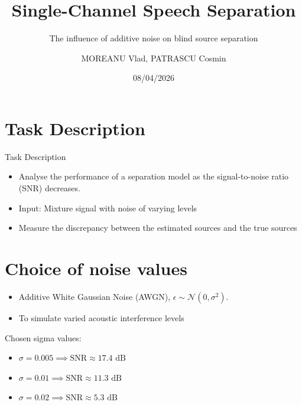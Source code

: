 \documentclass{beamer}
\author{MOREANU Vlad, PATRASCU Cosmin}
\title{Single-Channel Speech Separation}
\subtitle{The influence of additive noise on blind source separation}
\institute{National University of Science and Technology POLITEHNICA Bucharest}
\date{08/04/2026}
\begin{document}
\begin{frame}
    \titlepage
    \begin{figure}[htpb]
        \begin{center}
        \end{center}
    \end{figure}
\end{frame}

\begin{frame}
    \tableofcontents[sectionstyle=show,subsectionstyle=show/shaded/hide,subsubsectionstyle=show/shaded/hide]
\end{frame}


\section{Task Description}

\begin{frame}{Task Description}
    \begin{itemize}[<+-| alert@+>] 
        \item Analyse the performance of a separation model as the signal-to-noise ratio (SNR) decreases.
        \item Input: Mixture signal with noise of varying levels
        \item Measure the discrepancy between the estimated sources and the true sources
    \end{itemize}
\end{frame}


\section{Choice of noise values}
\begin{frame}
    \begin{itemize}
        \item Additive White Gaussian Noise (AWGN), $\epsilon \sim \mathcal{N}(0, \sigma^2)$.
        \item To simulate varied acoustic interference levels
    \end{itemize}
\end{frame}

\begin{frame}
    Chosen sigma values:
    \begin{itemize}
            \item $\sigma = 0.005 \implies \text{SNR} \approx 17.4 \text{ dB}$
            \item $\sigma = 0.01 \implies \text{SNR} \approx 11.3 \text{ dB}$
            \item $\sigma = 0.02 \implies \text{SNR} \approx 5.3 \text{ dB}$
    \end{itemize}
\end{frame}
\end{document}
